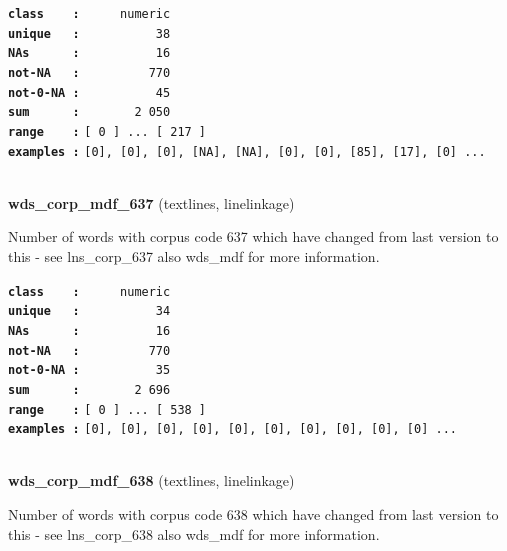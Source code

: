 \documentclass[]{article}
\begin{document}
\textbf{\texttt{class\ \ \ \ :}} \texttt{~~~~~numeric}\\
\textbf{\texttt{unique\ \ \ :}} \texttt{~~~~~~~~~~38}\\
\textbf{\texttt{NAs\ \ \ \ \ \ :}} \texttt{~~~~~~~~~~16}\\
\textbf{\texttt{not-NA\ \ \ :}} \texttt{~~~~~~~~~770}\\
\textbf{\texttt{not-0-NA\ :}} \texttt{~~~~~~~~~~45}\\
\textbf{\texttt{sum\ \ \ \ \ \ :}} \texttt{~~~~~~~2~050}\\
\textbf{\texttt{range\ \ \ \ :}}
\texttt{{[}\ 0\ {]}\ ...\ {[}\ 217\ {]}}\\
\textbf{\texttt{examples\ :}}
\texttt{{[}0{]},\ {[}0{]},\ {[}0{]},\ {[}NA{]},\ {[}NA{]},\ {[}0{]},\ {[}0{]},\ {[}85{]},\ {[}17{]},\ {[}0{]}\ ...}\\

~

\textbf{wds\_corp\_mdf\_637} (textlines, linelinkage)

Number of words with corpus code 637 which have changed from last
version to this - see lns\_corp\_637 also wds\_mdf for more information.

\textbf{\texttt{class\ \ \ \ :}} \texttt{~~~~~numeric}\\
\textbf{\texttt{unique\ \ \ :}} \texttt{~~~~~~~~~~34}\\
\textbf{\texttt{NAs\ \ \ \ \ \ :}} \texttt{~~~~~~~~~~16}\\
\textbf{\texttt{not-NA\ \ \ :}} \texttt{~~~~~~~~~770}\\
\textbf{\texttt{not-0-NA\ :}} \texttt{~~~~~~~~~~35}\\
\textbf{\texttt{sum\ \ \ \ \ \ :}} \texttt{~~~~~~~2~696}\\
\textbf{\texttt{range\ \ \ \ :}}
\texttt{{[}\ 0\ {]}\ ...\ {[}\ 538\ {]}}\\
\textbf{\texttt{examples\ :}}
\texttt{{[}0{]},\ {[}0{]},\ {[}0{]},\ {[}0{]},\ {[}0{]},\ {[}0{]},\ {[}0{]},\ {[}0{]},\ {[}0{]},\ {[}0{]}\ ...}\\

~

\textbf{wds\_corp\_mdf\_638} (textlines, linelinkage)

Number of words with corpus code 638 which have changed from last
version to this - see lns\_corp\_638 also wds\_mdf for more information.
\end{document}
